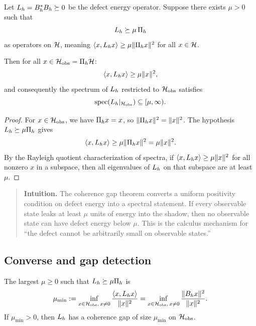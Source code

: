 \begin{theorem}
\label{thm:coherence-gap}
Let $\CCDefOp{d}{h} = \CCLeak{d}{h}^* \CCLeak{d}{h} \succeq 0$ be the defect energy operator.
Suppose there exists $\mu > 0$ such that
\[
\CCDefOp{d}{h} \succeq \mu \, \CCPi{h}
\]
as operators on $\cH$, meaning $\langle x, \CCDefOp{d}{h} x \rangle \ge \mu \|\CCPi{h} x\|^2$ for all $x \in \cH$.

Then for all $x \in \cH_{\mathrm{obs}} = \CCPi{h} \cH$:
\[
\langle x, \CCDefOp{d}{h} x \rangle \ge \mu \|x\|^2,
\]
and consequently the spectrum of $\CCDefOp{d}{h}$ restricted to $\cH_{\mathrm{obs}}$ satisfies
\[
\mathrm{spec}(\CCDefOp{d}{h}|_{\cH_{\mathrm{obs}}}) \subseteq [\mu, \infty).
\]
\end{theorem}

\begin{proof}
For $x \in \cH_{\mathrm{obs}}$, we have $\CCPi{h} x = x$, so $\|\CCPi{h} x\|^2 = \|x\|^2$.
The hypothesis $\CCDefOp{d}{h} \succeq \mu \CCPi{h}$ gives
\[
\langle x, \CCDefOp{d}{h} x \rangle \ge \mu \|\CCPi{h} x\|^2 = \mu \|x\|^2.
\]
By the Rayleigh quotient characterization of spectra, if $\langle x, \CCDefOp{d}{h} x \rangle \ge \mu \|x\|^2$ for all nonzero $x$ in a subspace, then all eigenvalues of $\CCDefOp{d}{h}$ on that subspace are at least $\mu$.
\end{proof}

\begin{quote}\small
\textbf{Intuition.}
The coherence gap theorem converts a uniform positivity condition on defect energy into a spectral statement.
If every observable state leaks at least $\mu$ units of energy into the shadow, then no observable state can have defect energy below $\mu$.
This is the calculus mechanism for ``the defect cannot be arbitrarily small on observable states.''
\end{quote}

\subsection{Converse and gap detection}

\begin{lemma}
\label{lem:gap-detection}
The largest $\mu \ge 0$ such that $\CCDefOp{d}{h} \succeq \mu \CCPi{h}$ is
\[
\mu_{\min} := \inf_{x \in \cH_{\mathrm{obs}},\, x \ne 0} \frac{\langle x, \CCDefOp{d}{h} x \rangle}{\|x\|^2}
= \inf_{x \in \cH_{\mathrm{obs}},\, x \ne 0} \frac{\|\CCLeak{d}{h} x\|^2}{\|x\|^2}.
\]
If $\mu_{\min} > 0$, then $\CCDefOp{d}{h}$ has a coherence gap of size $\mu_{\min}$ on $\cH_{\mathrm{obs}}$.
\end{lemma}

